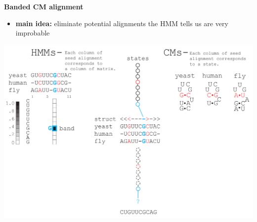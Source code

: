 \documentclass[landscape]{slides}
\begin{document}
\begin{slide}
\begin{center}
\large
\textbf{Banded CM alignment}
\end{center}
\medskip
\small
\begin{itemize}
\item
\textbf{main idea:} eliminate potential alignments the HMM tells us are very improbable
\end{itemize}
\begin{center}
\includegraphics[width=8in]{figs/post_hmm_to_cm_map2_layer12}
\end{center}
\vfill
\end{slide}
\end{document}
